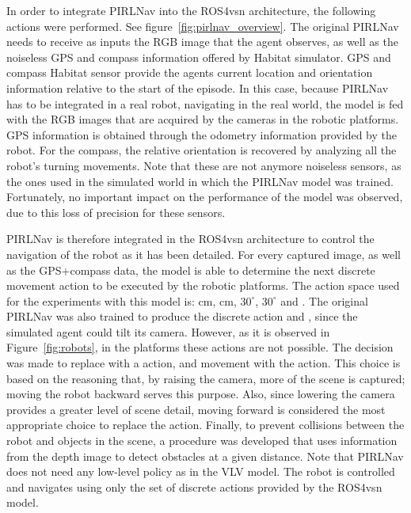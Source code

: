 In order to integrate PIRLNav into the ROS4\acrshort{vsn} architecture, the following actions were performed.
See figure~\ref{fig:pirlnav_overview}.
The original PIRLNav needs to receive as inputs the RGB image that the agent observes, as well as the noiseless GPS and compass information offered by Habitat simulator.
GPS and compass Habitat sensor provide the agent\textquotesingle s current location and orientation information relative to the start of the episode.
In this case, because PIRLNav has to be integrated in a real robot, navigating in the real world, the model is fed with the RGB images that are acquired by the cameras in the robotic platforms.
GPS information is obtained through the odometry information provided by the robot.
For the compass, the relative orientation is recovered by analyzing all the robot's turning movements.
Note that these are not anymore noiseless sensors, as the ones used in the simulated world in which the PIRLNav model was trained.
Fortunately, no important impact on the performance of the model was observed, due to this loss of precision for these sensors.

PIRLNav is therefore integrated in the ROS4\acrshort{vsn} architecture to control the navigation of the robot as it has been detailed.
For every captured image, as well as the GPS+compass data, the model is able to determine the next discrete movement action to be executed by the robotic platforms.
The action space used for the experiments with this model is:  cm,  cm, \turnright $30^\circ$, \turnleft  $30^\circ$ and \stopac.
The original PIRLNav was also trained to produce the discrete action \lookup and \lookdown, since the simulated agent could tilt its camera.
However, as it is observed in Figure~\ref{fig:robots}, in the platforms these actions are not possible.
The decision was made to replace \lookup with a \movebackward action, and \lookdown movement with the \moveforward action.
This choice is based on the reasoning that, by raising the camera, more of the scene is captured; moving the robot backward serves this purpose.
Also, since lowering the camera provides a greater level of scene detail, moving forward is considered the most appropriate choice to replace the \lookdown action.
Finally, to prevent collisions between the robot and objects in the scene, a procedure was developed that uses information from the depth image to detect obstacles at a given distance.
Note that PIRLNav does not need any low-level policy as in the VLV model.
The robot is controlled and navigates using only the set of discrete actions provided by the ROS4\acrshort{vsn} model.




